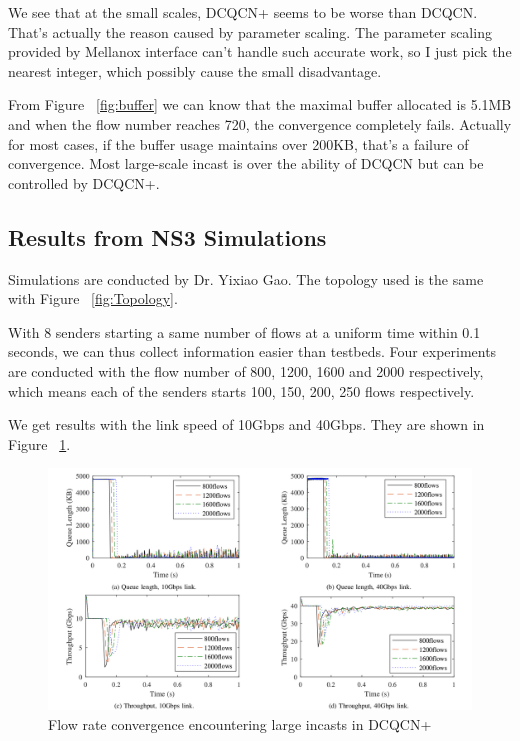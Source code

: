 \documentclass[12pt,a4paper]{article}
\begin{document}
We see that at the small scales, DCQCN+ seems to be worse than DCQCN.
That's actually the reason caused by parameter scaling.
The parameter scaling provided by Mellanox interface can't handle such accurate work, so I just pick the nearest integer,
which possibly cause the small disadvantage.

From Figure ~\ref{fig:buffer} we can know that the maximal buffer allocated is 5.1MB and when the flow number reaches 720,
the convergence completely fails.
Actually for most cases, if the buffer usage maintains over 200KB, that's a failure of convergence.
Most large-scale incast is over the ability of DCQCN but can be controlled by DCQCN+.

\subsection{Results from NS3 Simulations}

Simulations are conducted by Dr. Yixiao Gao. The topology used is the same with Figure ~\ref{fig:Topology}.

With 8 senders starting a same number of flows at a uniform time within 0.1 seconds,
we can thus collect information easier than testbeds.
Four experiments are conducted with the flow number of 800, 1200, 1600 and 2000 respectively,
which means each of the senders starts 100, 150, 200, 250 flows respectively.

We get results with the link speed of 10Gbps and 40Gbps.
They are shown in Figure ~\ref{fig:simulation}.

\begin{figure}[ht]
	\begin{center}
		\includegraphics[width=6in]{simulation}
		\caption{Flow rate convergence encountering large incasts in DCQCN+}
		\label{fig:simulation}
	\end{center}
\end{figure}
\end{document}
